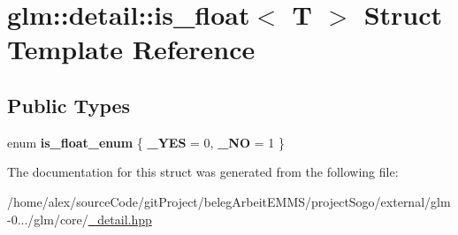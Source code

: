 \hypertarget{structglm_1_1detail_1_1is__float}{\section{glm\-:\-:detail\-:\-:is\-\_\-float$<$ T $>$ Struct Template Reference}
\label{structglm_1_1detail_1_1is__float}
}
\subsection*{Public Types}
\begin{DoxyCompactItemize}
\item 
enum {\bfseries is\-\_\-float\-\_\-enum} \{ {\bfseries \-\_\-\-Y\-E\-S} = 0, 
{\bfseries \-\_\-\-N\-O} = 1
 \}
\end{DoxyCompactItemize}


The documentation for this struct was generated from the following file\-:\begin{DoxyCompactItemize}
\item 
/home/alex/source\-Code/git\-Project/beleg\-Arbeit\-E\-M\-M\-S/project\-Sogo/external/glm-\/0.../glm/core/\hyperlink{__detail_8hpp}{\-\_\-detail.\-hpp}\end{DoxyCompactItemize}
